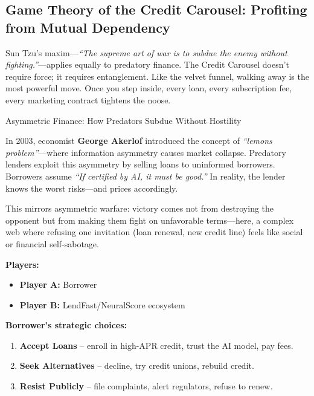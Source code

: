 \subsection{Game Theory of the Credit Carousel: Profiting from Mutual Dependency}

Sun Tzu’s maxim—\emph{“The supreme art of war is to subdue the enemy without fighting.”}—applies equally to predatory finance. The Credit Carousel doesn’t require force; it requires entanglement. Like the velvet funnel, walking away is the most powerful move. Once you step inside, every loan, every subscription fee, every marketing contract tightens the noose.

\medskip

\begin{HistoricalSidebar}{Asymmetric Finance: How Predators Subdue Without Hostility}

In 2003, economist \textbf{George Akerlof} introduced the concept of \emph{“lemons problem”}—where information asymmetry causes market collapse. Predatory lenders exploit this asymmetry by selling loans to uninformed borrowers. Borrowers assume \emph{“If certified by AI, it must be good.”} In reality, the lender knows the worst risks—and prices accordingly.

\medskip

This mirrors asymmetric warfare: victory comes not from destroying the opponent but from making them fight on unfavorable terms—here, a complex web where refusing one invitation (loan renewal, new credit line) feels like social or financial self-sabotage.

\end{HistoricalSidebar}

\medskip

\textbf{Players:}
\begin{itemize}
  \item \textbf{Player A:} Borrower
  \item \textbf{Player B:} LendFast/NeuralScore ecosystem
\end{itemize}

\textbf{Borrower’s strategic choices:}
\begin{enumerate}
  \item \textbf{Accept Loans} – enroll in high-APR credit, trust the AI model, pay fees.
  \item \textbf{Seek Alternatives} – decline, try credit unions, rebuild credit.
  \item \textbf{Resist Publicly} – file complaints, alert regulators, refuse to renew.
\end{enumerate}

